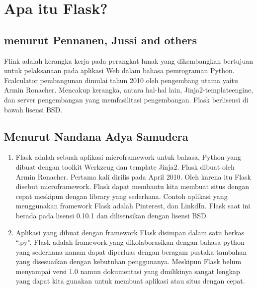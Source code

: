 


\section{Apa itu Flask?}
\subsection{menurut Pennanen, Jussi and others}
Flink adalah kerangka kerja pada perangkat lunak yang dikembangkan bertujuan untuk pelaksanaan pada aplikasi Web dalam bahasa pemrograman Python. Fcalculator pembangunan dimulai tahun 2010 oleh pengembang utama yaitu Armin Ronacher. Mencakup kerangka, antara hal-hal lain, Jinja2-templateengine, dan server pengembangan yang memfasilitasi pengembangan. Flask berlisensi di bawah lisensi BSD\cite{pennanen2018sovellus}.

\subsection{Menurut Nandana Adya Samudera}
\begin{enumerate}
\item Flask adalah sebuah aplikasi microframework untuk bahasa, Python yang dibuat dengan toolkit Werkzeug dan template Jinja2. Flask dibuat oleh Armin Ronacher. Pertama kali dirilis pada April 2010. Oleh karena itu Flask disebut microframework. Flask dapat membantu kita membuat situs dengan cepat meskipun dengan library yang sederhana. Contoh aplikasi yang menggunakan framework Flask adalah Pinterest, dan LinkdIn. Flask saat ini berada pada lisensi 0.10.1 dan dilisensikan dengan lisensi BSD.

\item Aplikasi yang dibuat dengan framework Flask disimpan dalam satu berkas “.py”. Flask adalah framework yang dikolaborasikan dengan bahasa python yang sederhana namun dapat diperluas dengan beragam pustaka tambahan yang disesuaikan dengan kebutuhan penggunanya. Meskipun Flask belum menyampai versi 1.0 namun dokumentasi yang dmilikinya sangat lengkap yang dapat kita gunakan untuk membuat aplikasi atau situs dengan cepat\cite{samudera2015perancangan}.
\end{enumerate}




